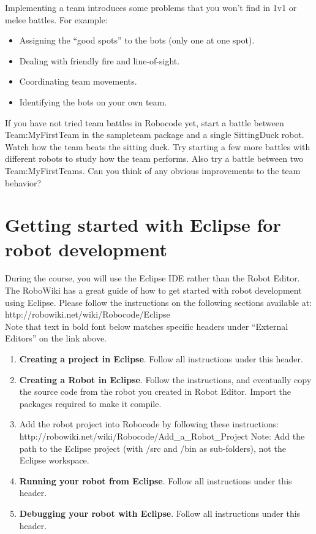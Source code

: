 \documentclass{scrreprt}
\begin{document}
Implementing a team introduces some problems that you won't find in 1v1 or melee battles. For example:

\begin{itemize}
\item Assigning the ``good spots'' to the bots (only one at one spot).
\item Dealing with friendly fire and line-of-sight.
\item Coordinating team movements.
\item Identifying the bots on your own team. 
\end{itemize}

If you have not tried team battles in Robocode yet, start a battle between Team:MyFirstTeam in the sampleteam package and a single SittingDuck robot. Watch how the team beats the sitting duck. Try starting a few more battles with different robots to study how the team performs. Also try a battle between two Team:MyFirstTeams. Can you think of any obvious improvements to the team behavior?

\newpage

\section{Getting started with Eclipse for robot development} \label{sec:eclipse}
During the course, you will use the Eclipse IDE rather than the Robot Editor. The RoboWiki has a great guide of how to get started with robot development using Eclipse. Please follow the instructions on the following sections available at:\\http://robowiki.net/wiki/Robocode/Eclipse
\\
Note that text in bold font below matches specific headers under ``External Editors'' on the link above.

\begin{enumerate}
\item \textbf{Creating a project in Eclipse}. Follow all instructions under this header.
\item \textbf{Creating a Robot in Eclipse}. Follow the instructions, and eventually copy the source code from the robot you created in Robot Editor. Import the packages required to make it compile.
\item Add the robot project into Robocode by following these instructions:\\http://robowiki.net/wiki/Robocode/Add\_a\_Robot\_Project Note: Add the path to the Eclipse project (with /src and /bin as sub-folders), not the Eclipse workspace.
\item \textbf{Running your robot from Eclipse}. Follow all instructions under this header.
\item \textbf{Debugging your robot with Eclipse}. Follow all instructions under this header.
\end{enumerate}
\end{document}
